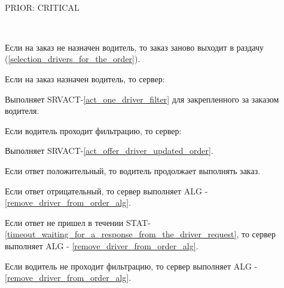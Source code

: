       \\ 
      PRIOR: CRITICAL\\   


      \begin{alg}\label{edit_order_alg} \mbox{}\\
        \begin{longenum}
          \item Если на заказ не назначен водитель, то заказ заново выходит в раздачу (\ref{selection_drivers_for_the_order}).
          \item Если на заказ назначен водитель, то сервер:
          \begin{longenum}
            \item Выполняет SRVACT-\ref{act_one_driver_filter} для закрепленного за заказом водителя.
              \begin{longenum}
                \item Если водитель проходит фильтрацию, то сервер:
                  \begin{longenum}
                   \item Выполняет SRVACT-\ref{act_offer_driver_updated_order}.
                     \begin{longenum}
                      \item Если ответ положительный, то водитель продолжает выполнять заказ.
                      \item Если ответ отрицательный, то сервер выполняет ALG - \ref{remove_driver_from_order_alg}.
                      \item Если ответ не пришел в течении STAT-\ref{timeout_waiting_for_a_response_from_the_driver_request}, то сервер выполняет ALG - \ref{remove_driver_from_order_alg}.
                     \end{longenum}
                  \end{longenum}
                \item Если водитель не проходит фильтрацию, то сервер выполняет ALG - \ref{remove_driver_from_order_alg}. 
              \end{longenum}
          \end{longenum}
        \end{longenum}
      \end{alg}

